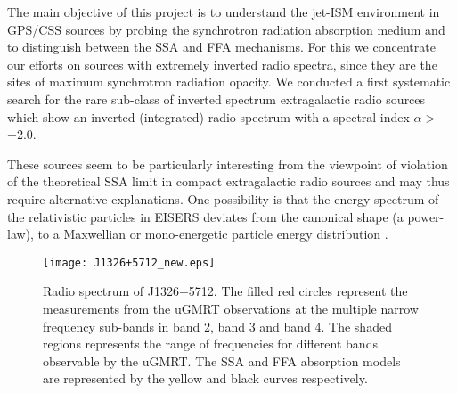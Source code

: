 \documentclass[proof]{WileyASNA-v1}
\begin{document}
The  main  objective of this project is to understand the jet-ISM environment  in  GPS/CSS  sources by  probing  the synchrotron radiation absorption medium and to distinguish between the SSA and FFA mechanisms. For this we concentrate our efforts on sources with extremely inverted radio spectra, since they are the sites of maximum synchrotron radiation opacity.
We conducted a first systematic search for the rare sub-class of inverted spectrum extragalactic radio sources which show an inverted (integrated) radio spectrum with a spectral index $\alpha >$ +2.0. %

These sources seem to be particularly interesting from the viewpoint of violation of the theoretical SSA limit in compact extragalactic radio sources and may thus require alternative explanations. %
One possibility is that the energy spectrum of the relativistic particles in EISERS deviates from the canonical shape (a power-law), to a Maxwellian or mono-energetic particle energy distribution \citep{Rees1967}.

\begin{figure}
\begin{center}
\texttt{[image: J1326+5712\_new.eps]}
\end{center}
\caption{\scriptsize{Radio spectrum of J1326+5712. The filled red circles represent the measurements from the uGMRT observations at the multiple narrow frequency sub-bands in band 2, band 3 and band 4. The shaded regions represents the range of frequencies for different bands observable by the uGMRT. The SSA and FFA absorption models are represented by the yellow and black curves respectively.}} \label{fig:spec_all} 
\end{figure}
\end{document}
